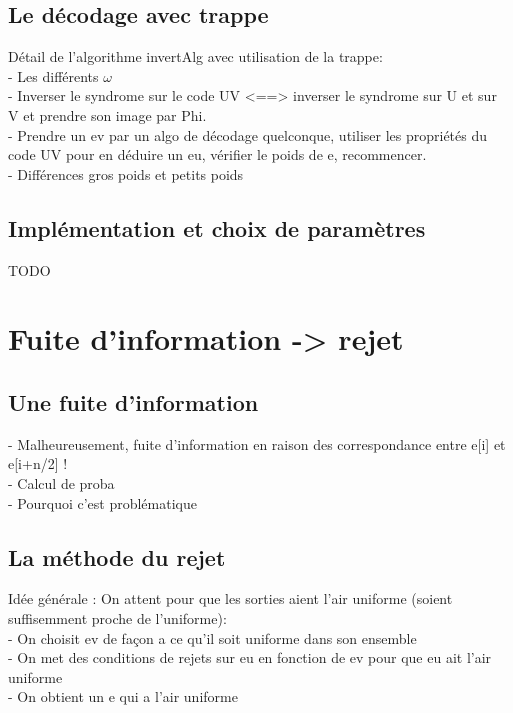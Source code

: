 \documentclass[12pt]{article}
\theoremstyle{definition}
\begin{document}
\subsection{Le décodage avec trappe}
Détail de l'algorithme invertAlg avec utilisation de la trappe: \\
- Les différents $\omega$ \\
- Inverser le syndrome sur le code UV <==> inverser le syndrome sur U et sur V et prendre son image par Phi. \\
- Prendre un ev par un algo de décodage quelconque, utiliser les propriétés du code UV pour en déduire un eu, vérifier le poids de e, recommencer. \\
- Différences gros poids et petits poids \\

\subsection{Implémentation et choix de paramètres}
TODO \\

\section{Fuite d'information -> rejet}

\subsection{Une fuite d'information}
- Malheureusement, fuite d'information en raison des correspondance entre e[i] et e[i+n/2] ! \\
- Calcul de proba \\
- Pourquoi c'est problématique \\ 

\subsection{La méthode du rejet}
Idée générale : On attent pour que les sorties aient l'air uniforme (soient suffisemment proche de l'uniforme): \\
- On choisit ev de façon a ce qu'il soit uniforme dans son ensemble \\
- On met des conditions de rejets sur eu en fonction de ev pour que eu ait l'air uniforme \\
- On obtient un e qui a l'air uniforme \\
\end{document}
